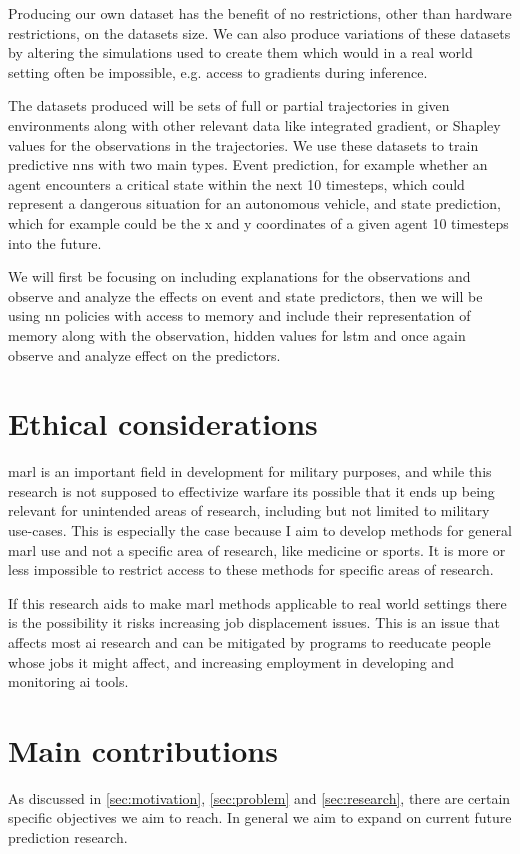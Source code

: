 \documentclass[UKenglish]{uiomasterthesis}
\begin{document}
Producing our own dataset has the benefit of no restrictions, other than hardware restrictions, on the datasets size. We can also produce variations of these datasets by altering the simulations used to create them which would in a real world setting often be impossible, e.g. access to gradients during inference.

The datasets produced will be sets of full or partial trajectories in given environments along with other relevant data like integrated gradient, or Shapley values for the observations in the trajectories. We use these datasets to train predictive \acp{nn} with two main types. Event prediction, for example whether an agent encounters a critical state within the next 10 timesteps, which could represent a dangerous situation for an autonomous vehicle, and state prediction, which for example could be the x and y coordinates of a given agent 10 timesteps into the future.

We will first be focusing on including explanations for the observations and observe and analyze the effects on event and state predictors, then we will be using \ac{nn} policies with access to memory and include their representation of memory along with the observation, hidden values for lstm and once again observe and analyze effect on the predictors.

\section{Ethical considerations}
\ac{marl} is an important field in development for military purposes\cite{military_marl}, and while this research is not supposed to effectivize warfare its possible that it ends up being relevant for unintended areas of research, including but not limited to military use-cases. This is especially the case because I aim to develop methods for general \ac{marl} use and not a specific area of research, like medicine or sports. It is more or less impossible to restrict access to these methods for specific areas of research.

If this research aids to make \ac{marl} methods applicable to real world settings there is the possibility it risks increasing job displacement issues. This is an issue that affects most \ac{ai} research and can be mitigated by programs to reeducate people whose jobs it might affect, and increasing employment in developing and monitoring \ac{ai} tools.


\section{Main contributions}
As discussed in \ref{sec:motivation}, \ref{sec:problem} and \ref{sec:research}, there are certain specific objectives we aim to reach. In general we aim to expand on current future prediction research.
\end{document}
